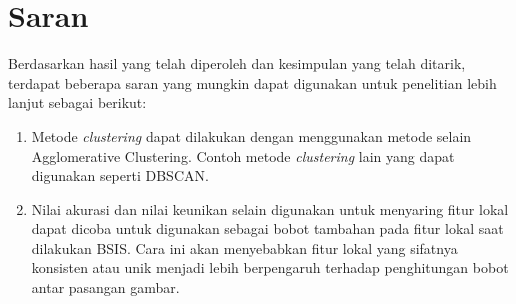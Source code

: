 \section{Saran}
Berdasarkan hasil yang telah diperoleh dan kesimpulan yang telah ditarik, terdapat beberapa saran yang mungkin dapat digunakan untuk penelitian lebih lanjut sebagai berikut:
\begin{enumerate}
	\item Metode \textit{clustering} dapat dilakukan dengan menggunakan metode selain Agglomerative Clustering. Contoh metode \textit{clustering} lain yang dapat digunakan seperti DBSCAN.
	\item Nilai akurasi dan nilai keunikan selain digunakan untuk menyaring fitur lokal dapat dicoba untuk digunakan sebagai bobot tambahan pada fitur lokal saat dilakukan BSIS. Cara ini akan menyebabkan fitur lokal yang sifatnya konsisten atau unik menjadi lebih berpengaruh terhadap penghitungan bobot antar pasangan gambar. 
\end{enumerate}